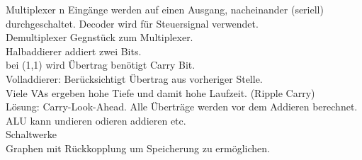 \documentclass{article}
\begin{document}
	Multiplexer n Eingänge werden auf einen Ausgang, nacheinander (seriell) durchgeschaltet. Decoder wird für Steuersignal verwendet. \\ 
	Demultiplexer Gegnstück zum Multiplexer. \\
	Halbaddierer addiert zwei Bits. \\
	bei (1,1) wird Übertrag benötigt Carry Bit. \\
	Volladdierer: Berücksichtigt Übertrag aus vorheriger Stelle. \\
	Viele VAs ergeben hohe Tiefe und damit hohe Laufzeit. (Ripple Carry) \\
	Lösung: Carry-Look-Ahead. Alle Überträge werden vor dem Addieren berechnet. \\
	ALU kann undieren odieren addieren etc. \\
	Schaltwerke \\
	Graphen mit Rückkopplung um Speicherung zu ermöglichen. \\
\end{document}
